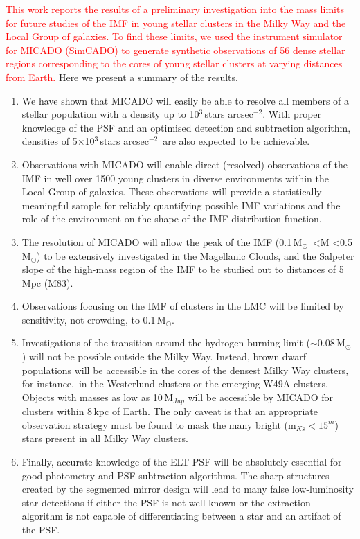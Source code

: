 \documentclass{aa}
\newcommand{\msun}{M$_\odot$~}
\newcommand{\msune}{M$_\odot$}
\newcommand{\s}{$\sim$}
\newcommand{\h}[1]{$^{#1}$}
\newcommand{\spa}{stars arcsec$^{-2}$~}
\newcommand{\spae}{stars arcsec$^{-2}$}
\newcommand{\langedit}[1]{\textcolor{red}{#1}}
\begin{document}
\langedit{This work reports the results of a preliminary investigation into the mass limits for future studies of the IMF in young stellar clusters in the Milky Way and the Local Group of galaxies.
To find these limits, we used the instrument simulator for MICADO (SimCADO) to generate synthetic observations of 56 dense stellar regions corresponding to the cores of young stellar clusters at varying distances from Earth.}
Here we present a summary of the results.

\begin{enumerate}
    \item We have shown that MICADO will easily be able to resolve all members of a stellar population with a density up to 10\h3\,\spae.
    With proper knowledge of the PSF and an optimised detection and subtraction algorithm, densities of 5$\times$10\h3\,\spa are also expected to be achievable.

    \item Observations with MICADO will enable direct (resolved) observations of the IMF in well over 1500 young clusters in diverse environments within the Local Group of galaxies.
    These observations will provide a statistically meaningful sample for reliably quantifying possible IMF variations and the role of the environment on the shape of the IMF distribution function.

    \item The resolution of MICADO will allow the peak of the IMF (0.1\,\msun\textless M \textless0.5\,\msune) to be extensively investigated in the Magellanic Clouds, and the Salpeter slope of the high-mass region of the IMF to be studied out to distances of 5\,Mpc (M83).

    \item Observations focusing on the IMF of clusters in the LMC will be limited by sensitivity, not crowding, to 0.1\,\msune.

    \item Investigations of the transition around the hydrogen-burning limit (\s0.08\,\msune) will not be possible outside the Milky Way.
    Instead, brown dwarf populations will be accessible in the cores of the densest Milky Way clusters, for instance,\ in the Westerlund clusters or the emerging W49A clusters.
    Objects with masses as low as 10\,M$_{Jup}$ will be accessible by MICADO for clusters within 8\,kpc of Earth.
    The only caveat is that an appropriate observation strategy must be found to mask the many bright (m$_{Ks}<15^m$) stars present in all Milky Way clusters.

    \item Finally, accurate knowledge of the ELT PSF will be absolutely essential for good photometry and PSF subtraction algorithms.
    The sharp structures created by the segmented mirror design will lead to many false low-luminosity star detections if either the PSF is not well known or the extraction algorithm is not capable of differentiating between a star and an artifact of the PSF\@.

\end{enumerate}
\end{document}
